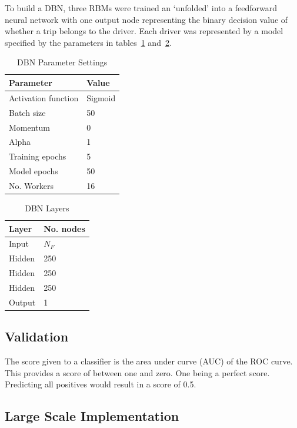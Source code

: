 \documentclass[a4paper, 11pt, twocolumn]{report}
\begin{document}
To build a DBN, three RBMs were trained an `unfolded' into a feedforward neural network with one output node representing the binary decision value of whether a trip belongs to the driver.
Each driver was represented by a model specified by the parameters in tables~\ref{table:dbnparams} and~\ref{table:dbnlayers}.

\begin{table}[h]
\centering
\small{
\caption{DBN Parameter Settings}
\label{table:dbnparams}
\begin{tabular}{|l|l|} \hline
\textbf{Parameter}&\textbf{Value}\\ \hline
Activation function & Sigmoid\\ \hline
Batch size & 50\\ \hline
Momentum & 0\\ \hline
Alpha & 1\\ \hline
Training epochs & 5\\ \hline
Model epochs & 50\\ \hline
No. Workers & 16\\ \hline
\end{tabular}}
\end{table}


\begin{table}[h]
\centering
\small{
\caption{DBN Layers}
\label{table:dbnlayers}
\begin{tabular}{|l|l|} \hline
\textbf{Layer}&\textbf{No. nodes}\\ \hline
Input & $N_F$\\ \hline
Hidden & 250\\ \hline
Hidden & 250\\ \hline
Hidden & 250\\ \hline
Output & 1\\ \hline
\end{tabular}}
\end{table}


\subsection{Validation}
The score given to a classifier is the area under curve (AUC) of the ROC curve. This provides a score of between one and zero. One being a perfect score. Predicting all positives would result in a score of 0.5.

\subsection{Large Scale Implementation}
\end{document}
